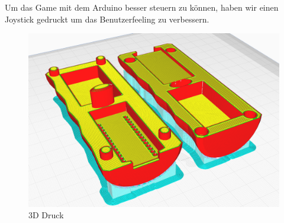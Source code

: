 Um das Game mit dem Arduino besser steuern zu können, haben wir einen Joystick gedruckt um das Benutzerfeeling zu verbessern.

\begin{figure}[H]
    \begin{center}
      \includegraphics[width=0.7\linewidth]{content/images/Joystick_3D-Print_Slicer.png}
      \caption{3D Druck}
    \end{center}
  \end{figure}

